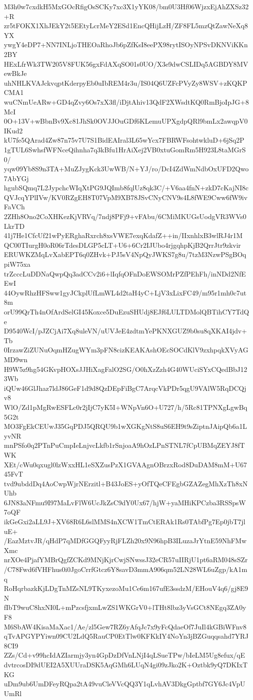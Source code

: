 M3h0w7cxdkH5MxGOcRfigOsSCKy7xc3X1yYK08/bm0U3Hf06WjzxEjAhZXSz32+R
zr5tFOKX1XhJEkY2t5EEtyLcrMeY2ESd1EncQHijLzH/ZF8FL5mzQtZawNeXq8YX
ywgY4eDP7+NN7INLjoTHEOaRhoJb6pZfKsI8eePX98rytISOyNPSvDKNViKKn2BY
HExLfrWk3TW205V8FUK56gxFdAXqSO01s0UO/X3e9dwCSLIDq5AGBDY8MVewBkJe
uhNHLKVAJckvqptKderpyEb0uIbREM4r3u/IS04Q6UZFcPVyZy8WSV+zKQKPCMA1
wuCNmUeARw+GD4qZvy6Os7xX3fl/iDjtAhiv13QdF2XWsdtKQ0RmBjoIpJG+8McI
0O+13V+wBbnBv9Xc81JhSk0OVJJOuGDf6KLemuUPXgdpQRl9bmLx2awqpV0IKud2
kU7fe5QArad4Zw87n75v7U7S1BidEAIral3L65wYcx7FBRWFsohtwkluD+6jSq2P
1gTUL6SwhsfWFNceQihnha7q3kBfu1HrAiXej2VB0xtuGomRm5H923L8taMGrS0/
yqw09Yb8S9n3TA+MuZJygKck3UwWB/N+YJ/ro/DcI4ZdWmNdbOxUFD2Qwo7AbYGj
hgubSQmq7L2JypchcWIqXtPG9JQImb8fqlUz8qk3C/+V6aa4fnN+zkD7cKajNI8c
QVJcqYPlIVw/KV0RZgEH8T07VpM9XB78JSvCNyCNV9s4L8fWE9Cww6fW9ivFaVCh
2ZHh8Ono2CoXHKezKjVRVq/7ndj8PFj9+vFAbu/6CMiMKUGsUodgVR3WVs0LkrTD
41j7He1CfcUf21wPyERghaRxrch8xsVWE7exqKdafZ++in/IIxnhlxB3wlRJ4r1M
QC00TIurgH0oR06rTdesDLGP5cLT+U6+6Cr2IJUbo4rjgqhpKjB2QrrJtr9zkvir
ERUWKZMqLvXabEPT6q0ZHvk+PJ5sV4NpQyJWKS7g8u/7tzM3NzwPSgBOqpiW75xa
trZcccLuDDNaQwpQq3adCCv2i6+lIqfqOFnDoEWSOMrPZfPEhFh/inNDd2NfEEwI
44OywRhzHFSww1gyJCkplUfLmWL4d2taH4yC+LjV3xLixFC49/m95r1mh0c7ut8m
orU99QrTh4nOfArdSelGI45Koxce5DuEzuSHUdj8EJf6LULTDMolQBTihCY7TdQe
D9540WcI/pJZCjAi7Xq8uleVN/uUVJeE4zdtmYePKNXGUZ9b0su8qXKAI4jdv+Tb
0IrzawZiZUNuOqmHZugWYm3pFN8cizKEAKAshOEcSOCdKlV9zxhpqkXVyAGMD9wn
H9W5z9hg54GKvpHOXsJJHiXagFalO2SG/O0hXzZzh4G40WUciSYxCQedBbJ123Wb
iQUw46GlJhaz7ldJ86GeF1d9d8QzDEpFiBgC7ArqcVkPDr5qgU9VAlW5RqDCQjv8
WlO/Zd1pMgRwESFLc0r2jIjC7yK5I+WNpVn6O+U727/h/5Rc81TPNXgLgwBq5G2t
MO3FgEkCEUwJ35GqPDJ5QRQU9b1wXGKgNtS8uS6EH9t9sZiptnJAipQb6a1LyvNR
mnPSfo0q2PTnPuCmpIeLnjvcLkfb1rSnjoaA9hOzLPnSTNL7fCpUBMqZEYJ8fTWK
XEt/cWu0qxugl0lzWxxHL1eSXZusPzX1GVAAgnOBrzxRod8DuDAM8mM+U6745FvT
tvd9ubddDq4AoCwpWjrNErzitl+B43JoES+yOfTQeCFEgbGZAZegMhXzTh8xNUhb
6JN83aNFmu9I97MaLvFlW6UcJkZsC9dY0Ux67/hjW+yaMHiKPCzba3RSSpsW7oQF
ikGeGxi2aLL9J+XV68R6L6slMMS4nXCW1TmCtERAk1Rs0TAbfPg7Ep0jbT7jluE+
/EazMztvJR/qHdP7qMDfGGQFyyRjFLZh20x9N96hpB3ILuzaJrYtnE59NhFMwXmc
nrXOe4PjafYMBrQgfZCKd9MNjKjrCwjSNwssJ32eCR57uIIRjU1pt6aRM048sSZr
/C78Fwd6fVHFhus0i0JgoCrrfGtcz6Y8savD3mmA906qm52LN28WL6uZgp/kA1mq
RoHqrbazkKjLDgTnMZsNL9TKyxezoMu1Ce6m167ufE3ssdzM/EHouV4q6/gj8E9N
fIbT9wuC8hxNI0L+mPzcsfjxmLwZS1WKGrV0+lTHt8lbz3yVsGCt8NEgq3ZA0yF8
M6SbAW4KisaMaXac1/Ae/zl5Gew7RZ6yAfqJc7x9yFcQdaeOf7JuIl4kGBiWFnv8
qTvAPGYPYiwn09CU2LdQ5RauCP0EtTlw0KFKkIY4NoYn3jBZGuqqsahd7YRJ8CI9
ZZs/Cd+v99hcIdAZIarmjy3yn4GpDzDfVnLNjI4qLSueTPw/bIeLM5Ug8efux/qE
dvtrcosDI9dUEI2A5XUUraDSK5AqGMh6LUqN4gi09zJko2K+Oztbk9yQ7DKIxTKG
uDm9ub6UmDFeyRQpa2tA49vuCleVVcQQ3Y1qLvhAV3DkgGptbf7GY6Jc4VpUUmRl
